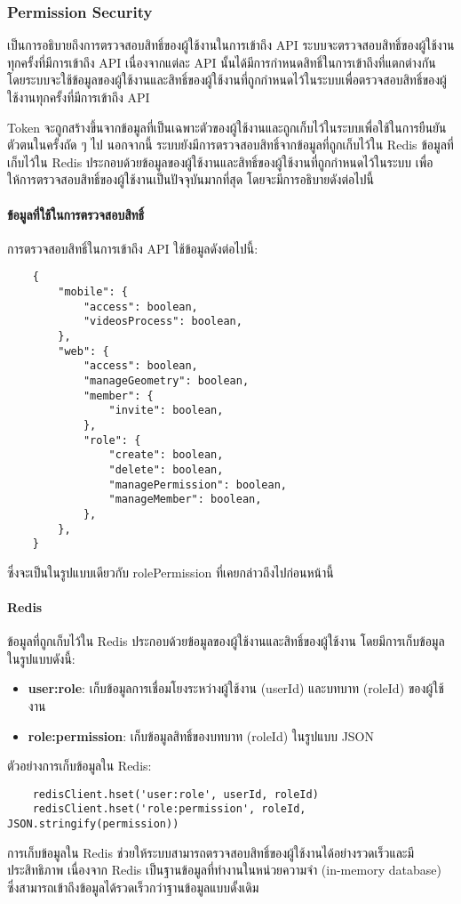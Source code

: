 \subsubsection{Permission Security}

\ifenglish
\else
เป็นการอธิบายถึงการตรวจสอบสิทธิ์ของผู้ใช้งานในการเข้าถึง API ระบบจะตรวจสอบสิทธิ์ของผู้ใช้งานทุกครั้งที่มีการเข้าถึง API เนื่องจากแต่ละ API นั้นได้มีการกำหนดสิทธิ์ในการเข้าถึงที่แตกต่างกัน โดยระบบจะใช้ข้อมูลของผู้ใช้งานและสิทธิ์ของผู้ใช้งานที่ถูกกำหนดไว้ในระบบเพื่อตรวจสอบสิทธิ์ของผู้ใช้งานทุกครั้งที่มีการเข้าถึง API

Token จะถูกสร้างขึ้นจากข้อมูลที่เป็นเฉพาะตัวของผู้ใช้งานและถูกเก็บไว้ในระบบเพื่อใช้ในการยืนยันตัวตนในครั้งถัด ๆ ไป นอกจากนี้ ระบบยังมีการตรวจสอบสิทธิ์จากข้อมูลที่ถูกเก็บไว้ใน Redis ข้อมูลที่เก็บไว้ใน Redis ประกอบด้วยข้อมูลของผู้ใช้งานและสิทธิ์ของผู้ใช้งานที่ถูกกำหนดไว้ในระบบ เพื่อให้การตรวจสอบสิทธิ์ของผู้ใช้งานเป็นปัจจุบันมากที่สุด โดยจะมีการอธิบายดังต่อไปนี้

\paragraph{ข้อมูลที่ใช้ในการตรวจสอบสิทธิ์} การตรวจสอบสิทธิ์ในการเข้าถึง API ใช้ข้อมูลดังต่อไปนี้:
\begin{lstlisting}
    {
        "mobile": {
            "access": boolean,
            "videosProcess": boolean,
        },
        "web": {
            "access": boolean,
            "manageGeometry": boolean,
            "member": {
                "invite": boolean,
            },
            "role": {
                "create": boolean,
                "delete": boolean,
                "managePermission": boolean,
                "manageMember": boolean,
            },
        },
    }
\end{lstlisting}
ซึ่งจะเป็นในรูปแบบเดียวกับ rolePermission ที่เคยกล่าวถึงไปก่อนหน้านี้

\paragraph{Redis}
ข้อมูลที่ถูกเก็บไว้ใน Redis ประกอบด้วยข้อมูลของผู้ใช้งานและสิทธิ์ของผู้ใช้งาน โดยมีการเก็บข้อมูลในรูปแบบดังนี้:
\begin{itemize}
    \item \textbf{user:role}: เก็บข้อมูลการเชื่อมโยงระหว่างผู้ใช้งาน (userId) และบทบาท (roleId) ของผู้ใช้งาน
    \item \textbf{role:permission}: เก็บข้อมูลสิทธิ์ของบทบาท (roleId) ในรูปแบบ JSON
\end{itemize}

ตัวอย่างการเก็บข้อมูลใน Redis:
\begin{lstlisting}
    redisClient.hset('user:role', userId, roleId)
    redisClient.hset('role:permission', roleId, JSON.stringify(permission))
\end{lstlisting}

การเก็บข้อมูลใน Redis ช่วยให้ระบบสามารถตรวจสอบสิทธิ์ของผู้ใช้งานได้อย่างรวดเร็วและมีประสิทธิภาพ เนื่องจาก Redis เป็นฐานข้อมูลที่ทำงานในหน่วยความจำ (in-memory database) ซึ่งสามารถเข้าถึงข้อมูลได้รวดเร็วกว่าฐานข้อมูลแบบดั้งเดิม
\fi